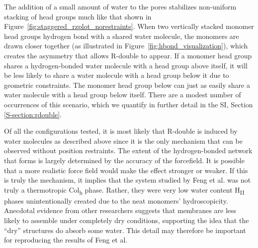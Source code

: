 \documentclass[journal=jpcbfk,manuscript=article]{achemso}
\begin{document}

  The addition of a small amount of water to the pores stabilizes non-uniform
  stacking of head groups much like that shown in
  Figure~\ref{fig:staggered_rzplot_norestraints}. When two vertically stacked
  monomer head groups hydrogen bond with a shared water molecule, the monomers
  are drawn closer together (as illustrated in
  Figure~\ref{fig:hbond_visualization}), which creates the asymmetry that allows
  R-double to appear. If a monomer head group shares a hydrogen-bonded water
  molecule with a head group above itself, it will be less likely to share a
  water molecule with a head group below it due to geometric constraints. The
  monomer head group below can just as easily share a water molecule with a head
  group below itself. There are a modest number of occurrences of this scenario,
  which we quantify in further detail in the SI, Section \ref{S-section:rdouble}.  

  Of all the configurations tested, it is most likely that R-double is induced
  by water molecules as described above since it is the only mechanism that can
  be observed without position restraints. The extent of the hydrogen-bonded
  network that forms is largely determined by the accuracy of the forcefield. It
  is possible that a more realistic force field would make the effect stronger or
  weaker. If this is truly the mechanism, it implies that the system studied by
  Feng et al.\cite{feng_scalable_2014,feng_thin_2016} was not truly a
  thermotropic Col\textsubscript{h} phase. Rather, they were very low water
  content H\textsubscript{II} phases unintentionally created due to the neat
  monomers' hydroscopicity.  Anecdotal evidence from other researchers suggests
  that membranes are less likely to assemble under completely dry
  conditions, supporting the idea %
  that the ``dry'' structures do absorb some water. This detail may therefore be
  important for reproducing the results of Feng et al.
\end{document}
